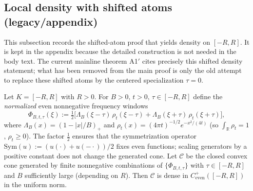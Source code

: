 \subsection{Local density with shifted atoms (legacy/appendix)}\label{app:legacy-a1-density}

This subsection records the shifted-atom proof that yields density on $[-R,R]$. It is
kept in the appendix because the detailed construction is not needed in the body text. The current
mainline theorem A1$'$ cites precisely this shifted density statement; what has been removed from the
main proof is only the old attempt to replace these shifted atoms by the centered specialization
$\tau=0$.

\begin{theorem}
Let $K=[-R,R]$ with $R>0$. For $B>0$, $t>0$, $\tau\in[-R,R]$ define the \emph{normalized} even nonnegative frequency windows
\[
\Phi_{B,t,\tau}(\xi) := \tfrac{1}{2}\bigl[\Lambda_B(\xi-\tau)\, \rho_t(\xi-\tau) + \Lambda_B(\xi+\tau)\, \rho_t(\xi+\tau)\bigr],
\]
where $\Lambda_B(x)=(1-|x|/B)_+$ and $\rho_t(x)=(4\pi t)^{-1/2} e^{-x^2/(4t)}$ (so $\int_{\mathbb R}\rho_t=1$, $\rho_t\ge0$). The factor $\tfrac{1}{2}$ ensures that the symmetrization operator $\mathrm{Sym}(u):=(u(\cdot)+u(-\cdot))/2$ fixes even functions; scaling generators by a positive constant does not change the generated cone. Let $\mathcal C$ be the closed convex cone generated by finite nonnegative combinations of $\{\Phi_{B,t,\tau}\}$ with $\tau\in[-R,R]$ and $B$ sufficiently large (depending on $R$). Then $\mathcal C$ is dense in $C^+_{\mathrm{even}}([-R,R])$ in the uniform norm.
\end{theorem}
